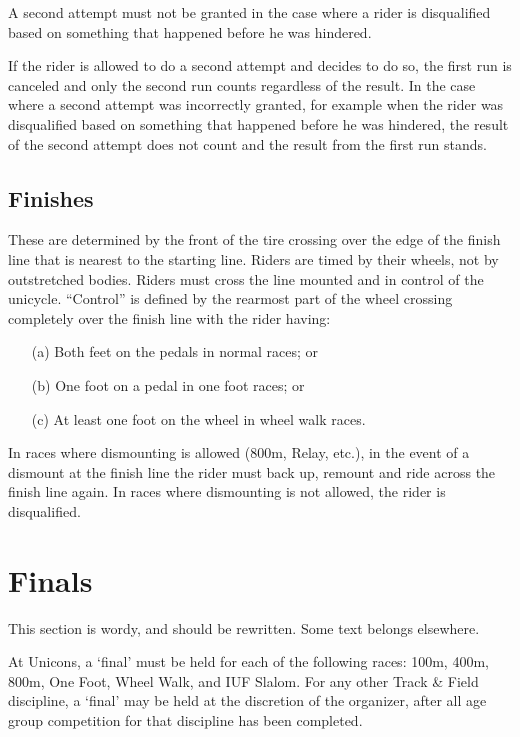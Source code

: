 A second attempt must not be granted in the case where a rider is disqualified based on something that happened before he was hindered.

If the rider is allowed to do a second attempt and decides to do so, the first run is canceled and only the second run counts regardless of the result.
In the case where a second attempt was incorrectly granted, for example when the rider was disqualified based on something that happened before he was hindered, the result of the second attempt does not count and the result from the first run stands.

\subsection{Finishes \label{sec:track-field_finishes}}

These are determined by the front of the tire crossing over the edge of the finish line that is nearest to the starting line.
Riders are timed by their wheels, not by outstretched bodies.
Riders must cross the line mounted and in control of the unicycle.
``Control'' is defined by the rearmost part of the wheel crossing completely over the finish line with the rider having: 
\begin{enumerate}
\item[(a)] Both feet on the pedals in normal races; or 
\item[(b)] One foot on a pedal in one foot races; or 
\item[(c)] At least one foot on the wheel in wheel walk races.
\end{enumerate}
In races where dismounting is allowed (800m, Relay, etc.), in the event of a dismount at the finish line the rider must back up, remount and ride across the finish line again.
In races where dismounting is not allowed, the rider is disqualified.

\section{Finals}

\begin{comment-2016}
This section is wordy, and should be rewritten.  Some text belongs elsewhere.
\end{comment-2016}

At Unicons, a `final' must be held for each of the following races: 100m, 400m, 800m, One Foot, Wheel Walk, and IUF Slalom. 
For any other Track \& Field discipline, a `final' may be held at the discretion of the organizer, after all age group competition for that discipline has been completed.

